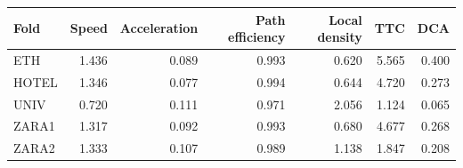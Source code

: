\begin{tabular}{lrrrrrr}
Fold & Speed & Acceleration & Path efficiency & Local density & TTC & DCA \\
\hline
ETH & 1.436 & 0.089 & 0.993 & 0.620 & 5.565 & 0.400 \\
HOTEL & 1.346 & 0.077 & 0.994 & 0.644 & 4.720 & 0.273 \\
UNIV & 0.720 & 0.111 & 0.971 & 2.056 & 1.124 & 0.065 \\
ZARA1 & 1.317 & 0.092 & 0.993 & 0.680 & 4.677 & 0.268 \\
ZARA2 & 1.333 & 0.107 & 0.989 & 1.138 & 1.847 & 0.208 \\
\end{tabular}
